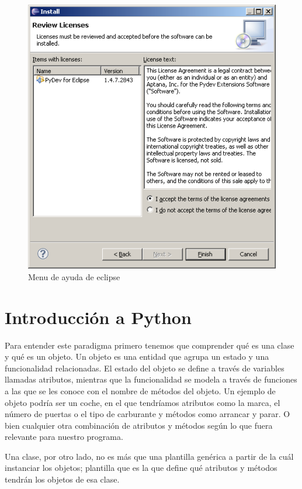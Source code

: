 \documentclass[12pt, twoside]{report}
\begin{document}
\begin{figure}
	\centering
	\includegraphics[width=1.0\linewidth]{Pydev5.png}
	\caption{Menu de ayuda de eclipse}
	\label{fig1023}
\end{figure}

\chapter{Introducción a Python}


Para entender este paradigma primero tenemos que comprender qué es una clase y qué es un objeto. Un objeto es una entidad que agrupa un estado y una funcionalidad relacionadas. El estado del objeto se define a través de variables llamadas atributos, mientras que la funcionalidad se modela a través de funciones a las que se les conoce con el nombre de métodos del objeto.
Un ejemplo de objeto podría ser un coche, en el que tendríamos atributos como la marca, el número de puertas o el tipo de carburante y métodos como arrancar y parar. O bien cualquier otra combinación de atributos y métodos según lo que fuera relevante para nuestro programa.

Una clase, por otro lado, no es más que una plantilla genérica a partir de la cuál instanciar los objetos; plantilla que es la que define qué atributos y métodos tendrán los objetos de esa clase.
\end{document}
